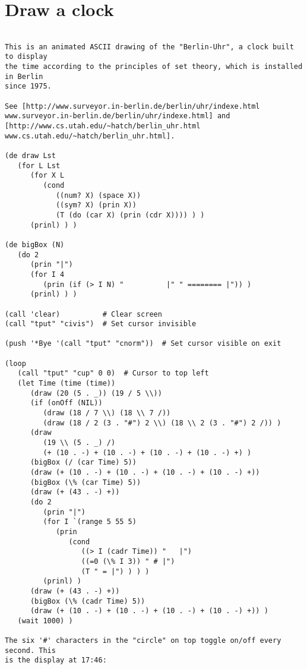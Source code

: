 \section*{Draw a clock}

\begin{verbatim}

This is an animated ASCII drawing of the "Berlin-Uhr", a clock built to display
the time according to the principles of set theory, which is installed in Berlin
since 1975.

See [http://www.surveyor.in-berlin.de/berlin/uhr/indexe.html
www.surveyor.in-berlin.de/berlin/uhr/indexe.html] and
[http://www.cs.utah.edu/~hatch/berlin_uhr.html
www.cs.utah.edu/~hatch/berlin_uhr.html].

(de draw Lst
   (for L Lst
      (for X L
         (cond
            ((num? X) (space X))
            ((sym? X) (prin X))
            (T (do (car X) (prin (cdr X)))) ) )
      (prinl) ) )

(de bigBox (N)
   (do 2
      (prin "|")
      (for I 4
         (prin (if (> I N) "          |" " ======== |")) )
      (prinl) ) )

(call 'clear)          # Clear screen
(call "tput" "civis")  # Set cursor invisible

(push '*Bye '(call "tput" "cnorm"))  # Set cursor visible on exit

(loop
   (call "tput" "cup" 0 0)  # Cursor to top left
   (let Time (time (time))
      (draw (20 (5 . _)) (19 / 5 \\))
      (if (onOff (NIL))
         (draw (18 / 7 \\) (18 \\ 7 /))
         (draw (18 / 2 (3 . "#") 2 \\) (18 \\ 2 (3 . "#") 2 /)) )
      (draw
         (19 \\ (5 . _) /)
         (+ (10 . -) + (10 . -) + (10 . -) + (10 . -) +) )
      (bigBox (/ (car Time) 5))
      (draw (+ (10 . -) + (10 . -) + (10 . -) + (10 . -) +))
      (bigBox (\% (car Time) 5))
      (draw (+ (43 . -) +))
      (do 2
         (prin "|")
         (for I `(range 5 55 5)
            (prin
               (cond
                  ((> I (cadr Time)) "   |")
                  ((=0 (\% I 3)) " # |")
                  (T " = |") ) ) )
         (prinl) )
      (draw (+ (43 . -) +))
      (bigBox (\% (cadr Time) 5))
      (draw (+ (10 . -) + (10 . -) + (10 . -) + (10 . -) +)) )
   (wait 1000) )

The six '#' characters in the "circle" on top toggle on/off every second. This
is the display at 17:46:


\end{verbatim}

